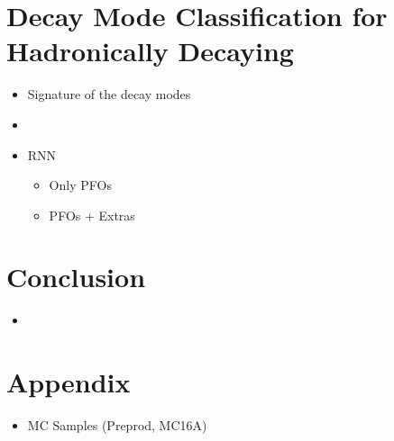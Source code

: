 \section{Decay Mode Classification for Hadronically Decaying}

\begin{itemize}
\item Signature of the decay modes
\item
\item RNN
  \begin{itemize}
  \item Only PFOs
  \item PFOs + Extras
  \end{itemize}
\end{itemize}

\section{Conclusion}

\begin{itemize}
\item
\end{itemize}

\section{Appendix}

\begin{itemize}
\item MC Samples (Preprod, MC16A)
\end{itemize}

